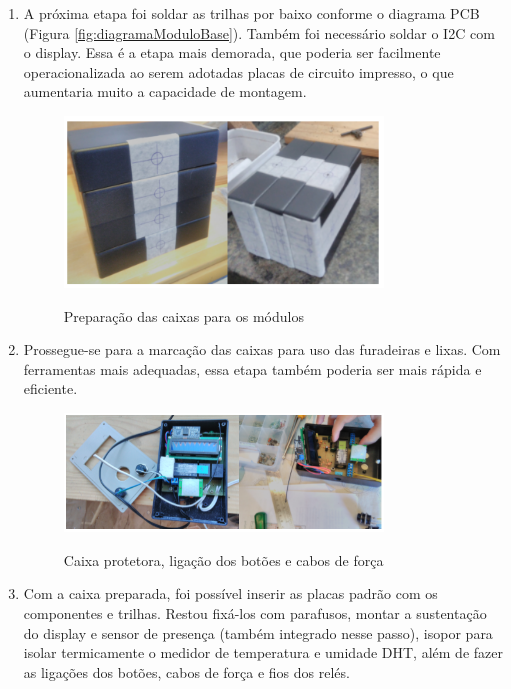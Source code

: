 \begin{enumerate}
	\item A próxima etapa foi soldar as trilhas por baixo conforme o diagrama PCB (Figura \ref{fig:diagramaModuloBase}). Também foi necessário soldar o I2C com o display. Essa é a etapa mais demorada, que poderia ser facilmente operacionalizada ao serem adotadas placas de circuito impresso, o que aumentaria muito a capacidade de montagem.

	\begin{figure}[H]
		\centering
		\caption{Preparação das caixas para os módulos}
		\includegraphics[width=0.8\textwidth]{PrepCaixasModulos}
		\label{fig:PrepCaixasModulos}
	\end{figure}

	\item Prossegue-se para a marcação das caixas para uso das furadeiras e lixas. Com ferramentas mais adequadas, essa etapa também poderia ser mais rápida e eficiente.

	\begin{figure}[H]
		\centering
		\caption{Caixa protetora, ligação dos botões e cabos de força}
		\includegraphics[width=0.8\textwidth]{BotoesCabosForca}
		\label{fig:BotoesCabosForca}
	\end{figure}

	\item Com a caixa preparada, foi possível inserir as placas padrão com os componentes e trilhas. Restou fixá-los com parafusos, montar a sustentação do display e sensor de presença (também integrado nesse passo), isopor para isolar termicamente o medidor de temperatura e umidade DHT, além de fazer as ligações dos botões, cabos de força e fios dos relés.


\end{enumerate}
